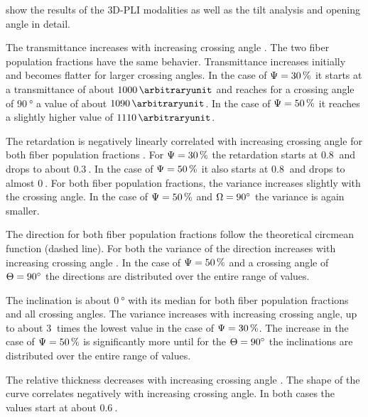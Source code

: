 % 
 show the results of the \ac{3D-PLI} modalities as well as the tilt analysis and opening angle in detail.
\par
The transmittance increases with increasing crossing angle \modelOmega{}.
The two fiber population fractions \modelPsi{} have the same behavier.
Transmittance increases initially and becomes flatter for larger crossing angles.
In the case of $\textnormal{$\Psi$} = \SI{30}{\percent}$ it starts at a transmittance of about $\SI{1000}{\arbitraryunit}$ and reaches for a crossing angle of $\SI{90}{\degree}$ a value of about $\SI{1090}{\arbitraryunit}$.
In the case of $\textnormal{$\Psi$} = \SI{50}{\percent}$ it reaches a slightly higher value of $\SI{1110}{\arbitraryunit}$.
\par
The retardation is negatively linearly correlated with increasing crossing angle for both fiber population fractions \modelPsi{}.
For $\textnormal{$\Psi$}=\SI{30}{\percent}$ the retardation starts at $\SI{0.8}{}$ and drops to about $\SI{0.3}{}$.
In the case of $\textnormal{$\Psi$}=\SI{50}{\percent}$ it also starts at $\SI{0.8}{}$ and drops to almost $\SI{0}{}$.
For both fiber population fractions, the variance increases slightly with the crossing angle.
In the case of $\textnormal{$\Psi$}=\SI{50}{\percent}$ and $\textnormal{$\Omega$}=\SI{90}{\degree}$ the variance is again smaller.
\par
The direction for both fiber population fractions \modelPsi{} follow the theoretical circmean function (dashed line).
For both \modelPsi{} the variance of the direction increases with increasing crossing angle \modelOmega{}.
In the case of $\textnormal{$\Psi$}=\SI{50}{\percent}$ and a crossing angle of $\textnormal{$\Theta$} = \SI{90}{\degree}$ the directions are distributed over the entire range of values.
\par
The inclination is about $\SI{0}{\degree}$ with its median for both fiber population fractions and all crossing angles.
The variance increases with increasing crossing angle, up to about $\SI{3}{}$ times the lowest value in the case of $\textnormal{$\Psi$} = \SI{30}{\percent}$.
The increase in the case of $\textnormal{$\Psi$} = \SI{50}{\percent}$ is significantly more until for the $\textnormal{$\Theta$}=\SI{90}{\degree}$ the inclinations are distributed over the entire range of values.
\par
The relative thickness \trel{} decreases with increasing crossing angle \modelOmega{}.
The shape of the curve correlates negatively with increasing crossing angle.
In both cases the \trel{} values start at about $\SI{0.6}{}$.
